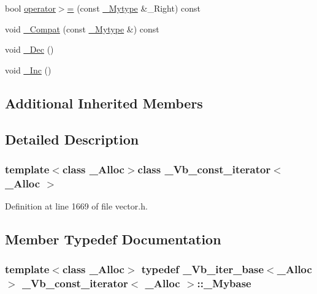 \begin{DoxyCompactItemize}
\item 
bool \hyperlink{class___vb__const__iterator_a19ded2784961c7d4600ea4e3181d3c5b}{operator$>$=} (const \hyperlink{class___vb__const__iterator_acab47f643a88497fc0bb9c74afc59fde}{\+\_\+\+Mytype} \&\+\_\+\+Right) const 
\item 
void \hyperlink{class___vb__const__iterator_af359318c3d113596df73f79719f71eee}{\+\_\+\+Compat} (const \hyperlink{class___vb__const__iterator_acab47f643a88497fc0bb9c74afc59fde}{\+\_\+\+Mytype} \&) const 
\item 
void \hyperlink{class___vb__const__iterator_ac429fd3f4687d20a9271e07d61a2504b}{\+\_\+\+Dec} ()
\item 
void \hyperlink{class___vb__const__iterator_a848814eb433056ebf21e58c35c247c1a}{\+\_\+\+Inc} ()
\end{DoxyCompactItemize}
\subsection*{Additional Inherited Members}


\subsection{Detailed Description}
\subsubsection*{template$<$class \+\_\+\+Alloc$>$class \+\_\+\+Vb\+\_\+const\+\_\+iterator$<$ \+\_\+\+Alloc $>$}



Definition at line 1669 of file vector.\+h.



\subsection{Member Typedef Documentation}
\hypertarget{class___vb__const__iterator_af4d51819174094e3576a3b45a3e3702f}{
\subsubsection[{\+\_\+\+Mybase}]{\setlength{\rightskip}{0pt plus 5cm}template$<$class \+\_\+\+Alloc$>$ typedef {\bf \+\_\+\+Vb\+\_\+iter\+\_\+base}$<$\+\_\+\+Alloc$>$ {\bf \+\_\+\+Vb\+\_\+const\+\_\+iterator}$<$ \+\_\+\+Alloc $>$\+::{\bf \+\_\+\+Mybase}}}\label{class___vb__const__iterator_af4d51819174094e3576a3b45a3e3702f}


